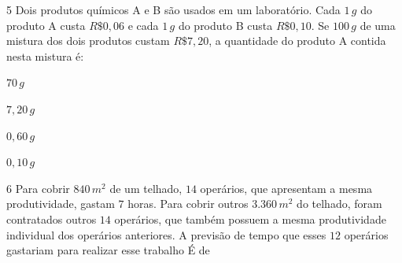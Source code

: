 \num{5}  Dois produtos químicos A e B são usados em um laboratório. Cada $1\,g$ do
produto A custa $R\$0,06$ e cada $1\,g$ do produto B custa
$R\$0,10$. Se $100\,g$ de uma mistura dos dois produtos custam $R\$7,20$, a
quantidade do produto A contida nesta mistura é:

\begin{escolha}
\item $70\,g$
\item $7,20\,g$
\item $0,60\,g$
\item $0,10\,g$
\end{escolha}



\num{6}  Para cobrir $840\,m^2$ de um telhado, $14$ operários, que apresentam a
mesma produtividade, gastam $7$ horas. Para cobrir outros $3.360\,m^2$ do
telhado, foram contratados outros $14$ operários, que também possuem a
mesma produtividade individual dos operários anteriores. A previsão de
tempo que esses $12$ operários gastariam para realizar esse trabalho É de

